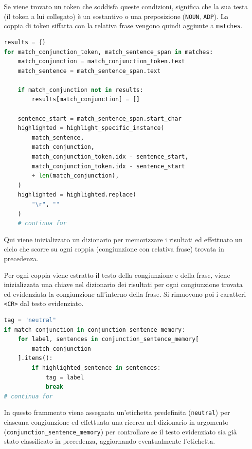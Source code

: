 \documentclass[12pt]{report}
\begin{document}
Se viene trovato un token che soddisfa queste condizioni, significa che la sua testa (il token a lui collegato) è un sostantivo o una preposizione (\texttt{NOUN}, \texttt{ADP}). La coppia di token siffatta con la relativa frase vengono quindi aggiunte a \texttt{matches}.


\begin{mdframed}
\small
\begin{lstlisting}[language=Python]
results = {}
for match_conjunction_token, match_sentence_span in matches:
    match_conjunction = match_conjunction_token.text
    match_sentence = match_sentence_span.text

    if match_conjunction not in results:
        results[match_conjunction] = []

    sentence_start = match_sentence_span.start_char
    highlighted = highlight_specific_instance(
        match_sentence,
        match_conjunction,
        match_conjunction_token.idx - sentence_start,
        match_conjunction_token.idx - sentence_start
        + len(match_conjunction),
    )
    highlighted = highlighted.replace(
        "\r", ""
    )
    # continua for
\end{lstlisting}
\end{mdframed}

\noindent Qui viene inizializzato un dizionario per memorizzare i risultati ed effettuato un ciclo che scorre su ogni coppia (congiunzione con relativa frase) trovata in precedenza.

Per ogni coppia viene estratto il testo della congiunzione e della frase, viene inizializzata una chiave nel dizionario dei risultati per ogni congiunzione trovata ed evidenziata la congiunzione all'interno della frase. Si rimuovono poi i caratteri \texttt{<CR>} dal testo evidenziato.


\begin{mdframed}
\small
\begin{lstlisting}[language=Python]
tag = "neutral"
if match_conjunction in conjunction_sentence_memory:
    for label, sentences in conjunction_sentence_memory[
        match_conjunction
    ].items():
        if highlighted_sentence in sentences:
            tag = label
            break
# continua for
\end{lstlisting}
\end{mdframed}

\noindent In questo frammento viene assegnata un'etichetta predefinita (\texttt{neutral}) per ciascuna congiunzione ed effettuata una ricerca nel dizionario in argomento (\texttt{conjunction\_sentence\_memory}) per controllare se il testo evidenziato sia già stato classificato in precedenza, aggiornando eventualmente l'etichetta.
\end{document}
